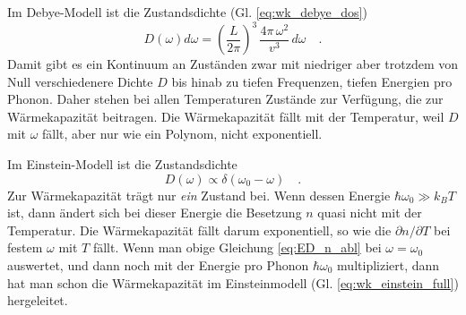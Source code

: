 Im Debye-Modell ist die Zustandsdichte (Gl. \ref{eq:wk_debye_dos})
\begin{equation}
D(\omega) d\omega = \left( \frac{L}{2 \pi} \right)^3 \,     \frac{ 4 \pi \, \omega^2 }{v^3}   \, d\omega  \quad .
\end{equation} 
Damit gibt es ein Kontinuum an Zuständen zwar mit niedriger aber trotzdem von Null verschiedenere Dichte $D$ bis hinab zu tiefen Frequenzen, tiefen Energien pro Phonon. Daher stehen bei allen Temperaturen Zustände zur Verfügung, die zur Wärmekapazität beitragen. Die Wärmekapazität fällt mit der Temperatur, weil $D$ mit $\omega$ fällt, aber nur wie ein Polynom, nicht exponentiell.

Im Einstein-Modell ist die Zustandsdichte
\begin{equation}
D(\omega) \propto \delta(\omega_0 - \omega) \quad .
\end{equation}
Zur Wärmekapazität trägt nur \emph{ein} Zustand bei. Wenn dessen Energie $\hbar \omega_0 \gg k_B T$ ist, dann ändert sich bei dieser Energie die Besetzung $n$ quasi nicht mit der Temperatur. Die Wärmekapazität fällt darum exponentiell, so wie die $\partial n / \partial T$ bei festem $\omega$ mit $T$ fällt.
Wenn man  obige Gleichung \ref{eq:ED_n_abl} bei $\omega = \omega_0$ auswertet, und dann noch mit der Energie pro Phonon $\hbar \omega_0$ multipliziert, dann hat man schon die Wärmekapazität im Einsteinmodell (Gl. \ref{eq:wk_einstein_full}) hergeleitet.



%

